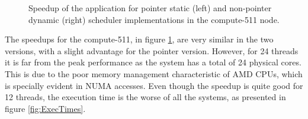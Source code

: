 \begin{figure}[!htp]
	\begin{center}
		\caption{Speedup of the \tth application for pointer static (left) and non-pointer dynamic (right) scheduler implementations in the compute-511 node.}
		\label{fig:Speedup511}
	\end{center}
\end{figure}

The speedups for the compute-511, in figure \ref{fig:Speedup511}, are very similar in the two versions, with a slight advantage for the pointer version. However, for 24 threads it is far from the peak performance as the system has a total of 24 physical cores. This is due to the poor memory management characteristic of AMD CPUs, which is specially evident in NUMA accesses. Even though the speedup is quite good for 12 threads, the execution time is the worse of all the systems, as presented in figure \ref{fig:ExecTimes}.

